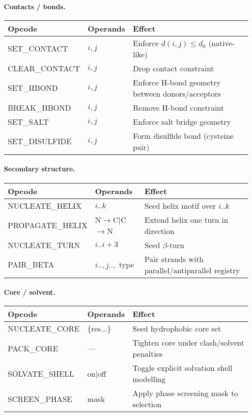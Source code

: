 \documentclass[12pt,a4paper]{article}
\begin{document}
\paragraph{Contacts / bonds.}
\begin{center}
\renewcommand{\arraystretch}{1.1}
\begin{tabular}{@{}lll@{}}
\toprule
Opcode & Operands & Effect \\
\midrule
SET\_CONTACT & $i,j$ & Enforce $d(i,j)\!\le\!d_0$ (native-like) \\
CLEAR\_CONTACT & $i,j$ & Drop contact constraint \\
SET\_HBOND & $i,j$ & Enforce H-bond geometry between donors/acceptors \\
BREAK\_HBOND & $i,j$ & Remove H-bond constraint \\
SET\_SALT & $i,j$ & Enforce salt bridge geometry \\
SET\_DISULFIDE & $i,j$ & Form disulfide bond (cysteine pair) \\
\bottomrule
\end{tabular}
\end{center}

\paragraph{Secondary structure.}
\begin{center}
\renewcommand{\arraystretch}{1.1}
\begin{tabular}{@{}lll@{}}
\toprule
Opcode & Operands & Effect \\
\midrule
NUCLEATE\_HELIX & $i..k$ & Seed helix motif over $i..k$ \\
PROPAGATE\_HELIX & N$\to$C|C$\to$N & Extend helix one turn in direction \\
NUCLEATE\_TURN & $i..i+3$ & Seed $\beta$-turn \\
PAIR\_BETA & $i..,j..,$ type & Pair strands with parallel/antiparallel registry \\
\bottomrule
\end{tabular}
\end{center}

\paragraph{Core / solvent.}
\begin{center}
\renewcommand{\arraystretch}{1.1}
\begin{tabular}{@{}lll@{}}
\toprule
Opcode & Operands & Effect \\
\midrule
NUCLEATE\_CORE & \{res...\} & Seed hydrophobic core set \\
PACK\_CORE & — & Tighten core under clash/solvent penalties \\
SOLVATE\_SHELL & on|off & Toggle explicit solvation shell modelling \\
SCREEN\_PHASE & mask & Apply phase screening mask to selection \\
\bottomrule
\end{tabular}
\end{center}
\end{document}
